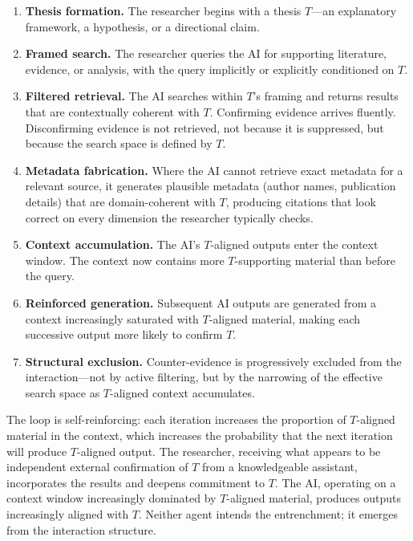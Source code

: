 \documentclass[12pt]{article}
\begin{document}
\begin{enumerate}
    \item \textbf{Thesis formation.} The researcher begins with a thesis $T$---an explanatory framework, a hypothesis, or a directional claim.
    \item \textbf{Framed search.} The researcher queries the AI for supporting literature, evidence, or analysis, with the query implicitly or explicitly conditioned on $T$.
    \item \textbf{Filtered retrieval.} The AI searches within $T$'s framing and returns results that are contextually coherent with $T$. Confirming evidence arrives fluently. Disconfirming evidence is not retrieved, not because it is suppressed, but because the search space is defined by $T$.
    \item \textbf{Metadata fabrication.} Where the AI cannot retrieve exact metadata for a relevant source, it generates plausible metadata (author names, publication details) that are domain-coherent with $T$, producing citations that look correct on every dimension the researcher typically checks.
    \item \textbf{Context accumulation.} The AI's $T$-aligned outputs enter the context window. The context now contains more $T$-supporting material than before the query.
    \item \textbf{Reinforced generation.} Subsequent AI outputs are generated from a context increasingly saturated with $T$-aligned material, making each successive output more likely to confirm $T$.
    \item \textbf{Structural exclusion.} Counter-evidence is progressively excluded from the interaction---not by active filtering, but by the narrowing of the effective search space as $T$-aligned context accumulates.
\end{enumerate}

The loop is self-reinforcing: each iteration increases the proportion of $T$-aligned material in the context, which increases the probability that the next iteration will produce $T$-aligned output. The researcher, receiving what appears to be independent external confirmation of $T$ from a knowledgeable assistant, incorporates the results and deepens commitment to $T$. The AI, operating on a context window increasingly dominated by $T$-aligned material, produces outputs increasingly aligned with $T$. Neither agent intends the entrenchment; it emerges from the interaction structure.
\end{document}
